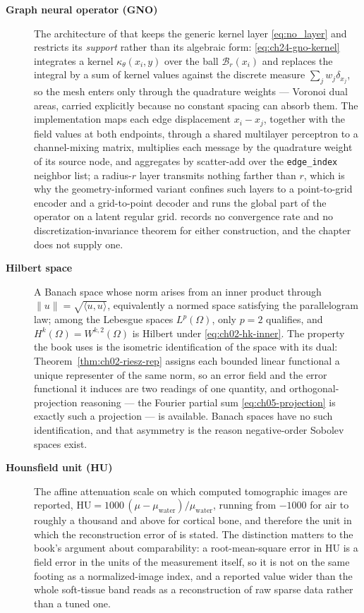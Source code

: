 \begin{description}
\item[\textbf{Graph neural operator (GNO)}] The architecture of
 that keeps the generic
kernel layer \eqref{eq:no_layer} and restricts its \emph{support} rather than its
algebraic form: \eqref{eq:ch24-gno-kernel} integrates a kernel $\kappa_{\theta}(x_{i},
y)$ over the ball $\mathcal{B}_{r}(x_{i})$ and replaces the integral by a sum of
kernel values against the discrete measure $\sum_{j} w_{j}\delta_{x_{j}}$, so the mesh
enters only through the quadrature weights --- Voronoi dual areas, carried explicitly
because no constant spacing can absorb them. The implementation maps each edge
displacement $x_{i} - x_{j}$, together with the field values at both endpoints, through a
shared multilayer perceptron to a channel-mixing
matrix, multiplies each message by the quadrature weight of its source node, and aggregates by scatter-add over the \texttt{edge\_index} neighbor list; a
radius-$r$ layer transmits nothing farther than $r$, which is why the geometry-informed
variant confines such layers to a point-to-grid encoder and a grid-to-point decoder and
runs the global part of the operator on a latent regular grid.
 records no convergence
rate and no discretization-invariance theorem for either construction, and the chapter
does not supply one. 

\item[\textbf{Hilbert space}] A Banach space whose norm arises from an inner product
through $\|u\| = \sqrt{\langle u, u \rangle}$, equivalently a normed space satisfying
the parallelogram law; among the Lebesgue spaces $L^{p}(\Omega)$, only $p = 2$ qualifies,
and $H^{k}(\Omega) = W^{k,2}(\Omega)$ is Hilbert under \eqref{eq:ch02-hk-inner}. The
property the book uses is the isometric identification of the space with its dual:
Theorem~\ref{thm:ch02-riesz-rep} assigns each bounded linear functional a unique
representer of the same norm, so an error field and the error functional it induces are
two readings of one quantity, and orthogonal-projection reasoning --- the Fourier
partial sum \eqref{eq:ch05-projection} is exactly such a projection --- is available.
Banach spaces have no such identification, and that asymmetry is the reason negative-order
Sobolev spaces exist. 

\item[\textbf{Hounsfield unit (HU)}] The affine attenuation scale on which computed
tomographic images are reported, $\mathrm{HU} = 1000\,(\mu - \mu_{\mathrm{water}})/
\mu_{\mathrm{water}}$, running from $-1000$ for air to roughly a thousand and above
for cortical bone, and therefore the unit in which the reconstruction
error of  is stated.
The distinction matters to the book's argument about comparability: a root-mean-square
error in HU is a field error in the units of the measurement itself, so it is not on the
same footing as a normalized-image index, and a reported value wider than the whole
soft-tissue band reads as a reconstruction of raw sparse data rather than a tuned one.


\end{description}
